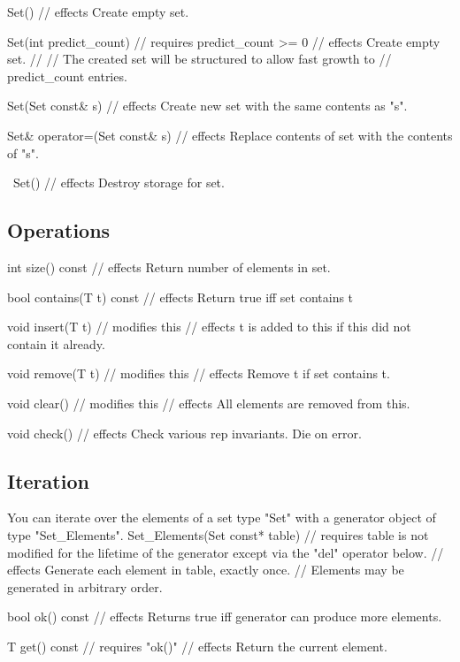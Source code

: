 Set()
     // effects   Create empty set.

Set(int predict_count)
     // requires  predict_count >= 0
     // effects   Create empty set.
     //
     // The created set will be structured to allow fast growth to
     // predict_count entries.

Set(Set const& s)
     // effects   Create new set with the same contents as "s".

Set& operator=(Set const& s)
     // effects   Replace contents of set with the contents of "s".

~Set()
     // effects   Destroy storage for set.

\subsection{Operations}

int size() const
    // effects   Return number of elements in set.

bool contains(T t) const
    // effects   Return true iff set contains t

void insert(T t)
    // modifies  this
    // effects	 t is added to this if this did not contain it already.

void remove(T t)
    // modifies  this
    // effects	 Remove t if set contains t.

void clear()
    // modifies  this
    // effects	 All elements are removed from this.

void check()
    // effects   Check various rep invariants.  Die on error.

\subsection{Iteration}

You can iterate over the elements of a set type "Set" with a generator
object of type "Set\_Elements".
Set_Elements(Set const* table)
    // requires  table is not modified for the lifetime of the generator
                 except via the "del" operator below.
    // effects   Generate each element in table, exactly once.
    //	         Elements may be generated in arbitrary order.

bool ok() const
    // effects   Returns true iff generator can produce more elements.

T get() const
    // requires  "ok()"
    // effects   Return the current element.

